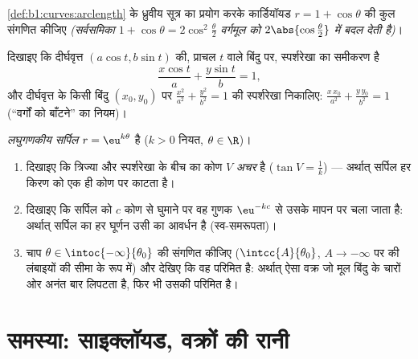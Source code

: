 \begin{exercise}[$\star\star$]\label{exo:b1:curves:10}
\cref{def:b1:curves:arclength} के ध्रुवीय सूत्र का प्रयोग करके कार्डियॉयड $r
= 1 + \cos\theta$ की कुल  संगणित कीजिए \emph{(सर्वसमिका $1 + \cos\theta
= 2\cos^2\frac\theta2$ वर्गमूल को $2\abs{\cos\frac\theta2}$ में बदल देती
है)}।
\end{exercise}

\begin{exercise}[$\star\star$]\label{exo:b1:curves:11}
दिखाइए कि दीर्घवृत्त $(a\cos t, b\sin t)$ की, प्राचल $t$ वाले बिंदु पर,
स्पर्शरेखा का समीकरण है
\[
\frac{x\cos t}{a} + \frac{y\sin t}{b} = 1 ,
\]
और दीर्घवृत्त के किसी बिंदु $(x_0, y_0)$ पर $\frac{x^2}{a^2} +
\frac{y^2}{b^2} = 1$ की स्पर्शरेखा निकालिए: $\frac{x\,x_0}{a^2} +
\frac{y\,y_0}{b^2} = 1$ (``वर्गों को बाँटने'' का नियम)।
\end{exercise}

\begin{exercise}[$\star\star\star$]\label{exo:b1:curves:12}
\emph{लघुगणकीय सर्पिल}  $r = \eu^{k\theta}$ है ($k > 0$ नियत,
$\theta \in \R$)।
\begin{enumerate}
  \item दिखाइए कि त्रिज्या और स्पर्शरेखा के बीच का कोण $V$ \emph{अचर} है
  ($\tan V = \frac1k$) --- अर्थात् सर्पिल हर किरण को एक ही कोण पर काटता है।
  \item दिखाइए कि सर्पिल को $c$ कोण से घुमाने पर वह गुणक $\eu^{-kc}$ से उसके
  मापन पर चला जाता है: अर्थात् सर्पिल का हर घूर्णन उसी का आवर्धन है
  (स्व-समरूपता)।
  \item चाप $\theta \in \intoc{-\infty}{\theta_0}$ की  संगणित कीजिए
  ($\intcc{A}{\theta_0}$, $A \to -\infty$ पर की लंबाइयों की सीमा के रूप में)
  और देखिए कि वह परिमित है: अर्थात् ऐसा वक्र जो मूल बिंदु के चारों ओर अनंत
  बार लिपटता है, फिर भी उसकी  परिमित है।
\end{enumerate}
\end{exercise}

\section{समस्या: साइक्लॉयड, वक्रों की रानी}

